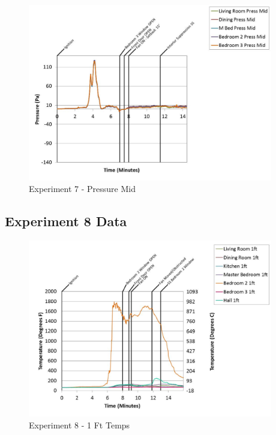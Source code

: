 \documentclass{article}
\begin{document}
\begin{appendices}
	\clearpage

	\begin{figure}[h!]
		\centering
		\includegraphics[height=3.05in]{0_Images/Results_Charts/Exp_7_Charts/PressureMid.pdf}
		\caption{Experiment 7 - Pressure Mid}
	\end{figure}
 

		\clearpage
\clearpage		\large
\subsection{Experiment 8 Data} \label{App:Exp8Results} 

	\begin{figure}[h!]
		\centering
		\includegraphics[height=3.05in]{0_Images/Results_Charts/Exp_8_Charts/1FtTemps.pdf}
		\caption{Experiment 8 - 1 Ft Temps}
	\end{figure}
 


\end{appendices}
\end{document}
